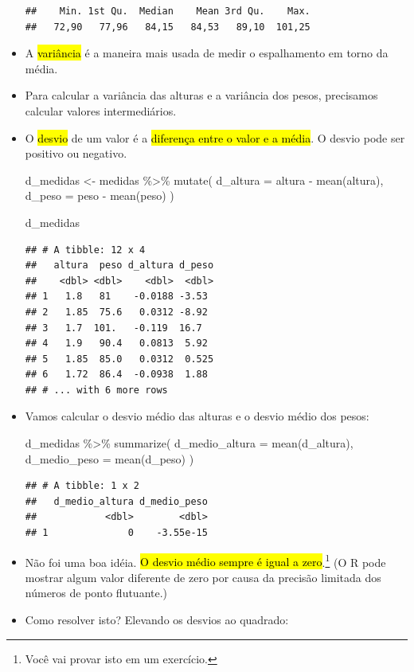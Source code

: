 \documentclass[
  11pt]{report}
\newenvironment{Shaded}{\begin{snugshade}}{\end{snugshade}}
\newcommand{\AttributeTok}[1]{\textcolor[rgb]{0.77,0.63,0.00}{#1}}
\newcommand{\FunctionTok}[1]{\textcolor[rgb]{0.00,0.00,0.00}{#1}}
\newcommand{\NormalTok}[1]{#1}
\newcommand{\OtherTok}[1]{\textcolor[rgb]{0.56,0.35,0.01}{#1}}
\newcommand{\SpecialCharTok}[1]{\textcolor[rgb]{0.00,0.00,0.00}{#1}}
\renewenvironment{Shaded}{
    \begin{mdframed}[%
      roundcorner=2pt,%
      innerleftmargin=5pt,%
      innerrightmargin=5pt,%
      topline=true,%
      leftline=true,%
      rightline=true,%
      bottomline=true,%
      linewidth=0.5pt,%
      linecolor=black!20,%
      backgroundcolor=black!2,%
      skipabove=2ex,%
      skipbelow=2.5ex%
    ]%
  }
  {
    \end{mdframed}
  }
\begin{document}
\begin{itemize}
\begin{verbatim}
##    Min. 1st Qu.  Median    Mean 3rd Qu.    Max. 
##   72,90   77,96   84,15   84,53   89,10  101,25
\end{verbatim}
\item
  A {\hl{variância}} é a maneira mais usada de medir o espalhamento em torno da média.
\item
  Para calcular a variância das alturas e a variância dos pesos, precisamos calcular valores intermediários.
\item
  O {\hl{desvio}} de um valor é a {\hl{diferença entre o valor e a média}}. O desvio pode ser positivo ou negativo.

\begin{Shaded}
\begin{Highlighting}[]
\NormalTok{d\_medidas }\OtherTok{\textless{}{-}}\NormalTok{ medidas }\SpecialCharTok{\%\textgreater{}\%} 
  \FunctionTok{mutate}\NormalTok{(}
    \AttributeTok{d\_altura =}\NormalTok{ altura }\SpecialCharTok{{-}} \FunctionTok{mean}\NormalTok{(altura),}
    \AttributeTok{d\_peso =}\NormalTok{ peso }\SpecialCharTok{{-}} \FunctionTok{mean}\NormalTok{(peso)}
\NormalTok{  )}

\NormalTok{d\_medidas}
\end{Highlighting}
\end{Shaded}

\begin{verbatim}
## # A tibble: 12 x 4
##   altura  peso d_altura d_peso
##    <dbl> <dbl>    <dbl>  <dbl>
## 1   1.8   81    -0.0188 -3.53 
## 2   1.85  75.6   0.0312 -8.92 
## 3   1.7  101.   -0.119  16.7  
## 4   1.9   90.4   0.0813  5.92 
## 5   1.85  85.0   0.0312  0.525
## 6   1.72  86.4  -0.0938  1.88 
## # ... with 6 more rows
\end{verbatim}
\item
  Vamos calcular o desvio médio das alturas e o desvio médio dos pesos:

\begin{Shaded}
\begin{Highlighting}[]
\NormalTok{d\_medidas }\SpecialCharTok{\%\textgreater{}\%} 
  \FunctionTok{summarize}\NormalTok{(}
    \AttributeTok{d\_medio\_altura =} \FunctionTok{mean}\NormalTok{(d\_altura),}
    \AttributeTok{d\_medio\_peso =} \FunctionTok{mean}\NormalTok{(d\_peso)}
\NormalTok{  )}
\end{Highlighting}
\end{Shaded}

\begin{verbatim}
## # A tibble: 1 x 2
##   d_medio_altura d_medio_peso
##            <dbl>        <dbl>
## 1              0    -3.55e-15
\end{verbatim}
\item
  \protect\hypertarget{desvio-medio-zero}{}{} Não foi uma boa idéia. {\hl{O desvio médio sempre é igual a zero}}.\footnote{Você vai provar isto em um exercício.} (O R pode mostrar algum valor diferente de zero por causa da precisão limitada dos números de ponto flutuante.)
\item
  Como resolver isto? Elevando os desvios ao quadrado:


\end{itemize}
\end{document}
